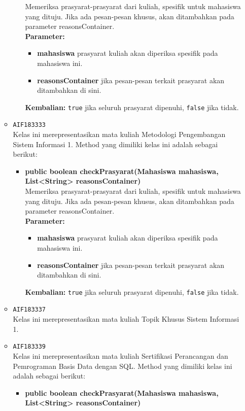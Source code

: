 \begin{enumerate}
\begin{itemize}
\begin{itemize}
Memeriksa prasyarat-prasyarat dari kuliah, spesifik untuk mahasiswa yang dituju. Jika ada pesan-pesan khusus, akan ditambahkan pada parameter reasonsContainer.\\
\textbf{Parameter:}
\begin{itemize}
\item \textbf{mahasiswa} prasyarat kuliah akan diperiksa spesifik pada mahasiswa ini.
\item \textbf{reasonsContainer} jika pesan-pesan terkait prasyarat akan ditambahkan di sini.
\end{itemize}
\textbf{Kembalian:} \texttt{true} jika seluruh prasyarat dipenuhi, \texttt{false} jika tidak.
\end{itemize}
\item \texttt{AIF183333} \\
Kelas ini merepresentasikan mata kuliah Metodologi Pengembangan Sistem Informasi 1. Method yang dimiliki kelas ini adalah sebagai berikut: 
\begin{itemize}
\item \textbf{public boolean checkPrasyarat(Mahasiswa mahasiswa, List<String> reasonsContainer)}\\
Memeriksa prasyarat-prasyarat dari kuliah, spesifik untuk mahasiswa yang dituju. Jika ada pesan-pesan khusus, akan ditambahkan pada parameter reasonsContainer.\\
\textbf{Parameter:}
\begin{itemize}
\item \textbf{mahasiswa} prasyarat kuliah akan diperiksa spesifik pada mahasiswa ini.
\item \textbf{reasonsContainer} jika pesan-pesan terkait prasyarat akan ditambahkan di sini.
\end{itemize}
\textbf{Kembalian:} \texttt{true} jika seluruh prasyarat dipenuhi, \texttt{false} jika tidak.
\end{itemize}
\item \texttt{AIF183337} \\
Kelas ini merepresentasikan mata kuliah Topik Khusus Sistem Informasi 1.
\item \texttt{AIF183339} \\
Kelas ini merepresentasikan mata kuliah Sertifikasi Perancangan dan Pemrograman Basis Data dengan SQL. Method yang dimiliki kelas ini adalah sebagai berikut: 
\begin{itemize}
\item \textbf{public boolean checkPrasyarat(Mahasiswa mahasiswa, List<String> reasonsContainer)}\\

\end{itemize}
\end{itemize}
\end{enumerate}
